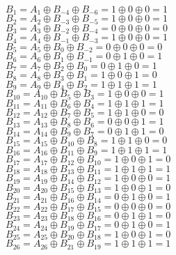 $B_{1}=A_{1}\oplus B_{-4}\oplus B_{-6}=1\oplus 0\oplus 0=1$\\
$B_{2}=A_{2}\oplus B_{-3}\oplus B_{-5}=1\oplus 0\oplus 0=1$\\
$B_{3}=A_{3}\oplus B_{-2}\oplus B_{-4}=0\oplus 0\oplus 0=0$\\
$B_{4}=A_{4}\oplus B_{-1}\oplus B_{-3}=1\oplus 0\oplus 0=1$\\
$B_{5}=A_{5}\oplus B_{0}\oplus B_{-2}=0\oplus 0\oplus 0=0$\\
$B_{6}=A_{6}\oplus B_{1}\oplus B_{-1}=0\oplus 1\oplus 0=1$\\
$B_{7}=A_{7}\oplus B_{2}\oplus B_{0}=0\oplus 1\oplus 0=1$\\
$B_{8}=A_{8}\oplus B_{3}\oplus B_{1}=1\oplus 0\oplus 1=0$\\
$B_{9}=A_{9}\oplus B_{4}\oplus B_{2}=1\oplus 1\oplus 1=1$\\
$B_{10}=A_{10}\oplus B_{5}\oplus B_{3}=1\oplus 0\oplus 0=1$\\
$B_{11}=A_{11}\oplus B_{6}\oplus B_{4}=1\oplus 1\oplus 1=1$\\
$B_{12}=A_{12}\oplus B_{7}\oplus B_{5}=1\oplus 1\oplus 0=0$\\
$B_{13}=A_{13}\oplus B_{8}\oplus B_{6}=0\oplus 0\oplus 1=1$\\
$B_{14}=A_{14}\oplus B_{9}\oplus B_{7}=0\oplus 1\oplus 1=0$\\
$B_{15}=A_{15}\oplus B_{10}\oplus B_{8}=1\oplus 1\oplus 0=0$\\
$B_{16}=A_{16}\oplus B_{11}\oplus B_{9}=1\oplus 1\oplus 1=1$\\
$B_{17}=A_{17}\oplus B_{12}\oplus B_{10}=1\oplus 0\oplus 1=0$\\
$B_{18}=A_{18}\oplus B_{13}\oplus B_{11}=1\oplus 1\oplus 1=1$\\
$B_{19}=A_{19}\oplus B_{14}\oplus B_{12}=1\oplus 0\oplus 0=1$\\
$B_{20}=A_{20}\oplus B_{15}\oplus B_{13}=1\oplus 0\oplus 1=0$\\
$B_{21}=A_{21}\oplus B_{16}\oplus B_{14}=0\oplus 1\oplus 0=1$\\
$B_{22}=A_{22}\oplus B_{17}\oplus B_{15}=0\oplus 0\oplus 0=0$\\
$B_{23}=A_{23}\oplus B_{18}\oplus B_{16}=0\oplus 1\oplus 1=0$\\
$B_{24}=A_{24}\oplus B_{19}\oplus B_{17}=0\oplus 1\oplus 0=1$\\
$B_{25}=A_{25}\oplus B_{20}\oplus B_{18}=1\oplus 0\oplus 1=0$\\
$B_{26}=A_{26}\oplus B_{21}\oplus B_{19}=1\oplus 1\oplus 1=1$\\
